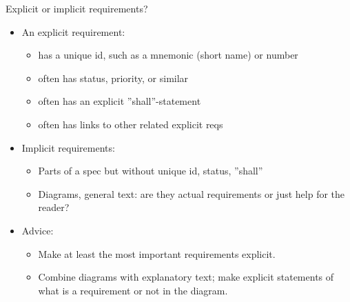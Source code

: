 \begin{Slide}{Explicit or implicit requirements?}

\begin{itemize}
\item An explicit requirement: 
\begin{itemize}
\item has a unique id, such as a mnemonic (short name) or number
\item often has status, priority, or similar 
\item often has an explicit ''shall''-statement
\item often has links to other related explicit reqs
\end{itemize}
\item Implicit requirements:
\begin{itemize}
\item Parts of a spec but without unique id, status, ''shall'' 
\item Diagrams, general text: are they actual requirements or just help for the reader?
\end{itemize}
\item Advice: 
\begin{itemize}
\item Make at least the most important requirements explicit.
\item Combine diagrams with explanatory text; make explicit statements of what is a requirement or not in the diagram. 



\end{itemize}
\end{itemize}
\end{Slide}